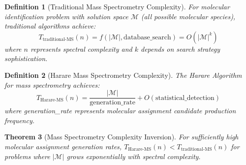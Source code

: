 \documentclass[11pt,a4paper]{article}
\newtheorem{theorem}{Theorem}[section]
\newtheorem{definition}[theorem]{Definition}
\theoremstyle{remark}
\begin{document}
\begin{definition}[Traditional Mass Spectrometry Complexity]
For molecular identification problem with solution space $\mathcal{M}$ (all possible molecular species), traditional algorithms achieve:
$$T_{\text{traditional-MS}}(n) = f(|\mathcal{M}|, \text{database\_search}) = O(|\mathcal{M}|^k)$$
where $n$ represents spectral complexity and $k$ depends on search strategy sophistication.
\end{definition}

\begin{definition}[Harare Mass Spectrometry Complexity]
The Harare Algorithm for mass spectrometry achieves:
$$T_{\text{Harare-MS}}(n) = \frac{|\mathcal{M}|}{\text{generation\_rate}} + O(\text{statistical\_detection})$$
where generation\_rate represents molecular assignment candidate production frequency.
\end{definition}

\begin{theorem}[Mass Spectrometry Complexity Inversion]
For sufficiently high molecular assignment generation rates, $T_{\text{Harare-MS}}(n) < T_{\text{traditional-MS}}(n)$ for problems where $|\mathcal{M}|$ grows exponentially with spectral complexity.
\end{theorem}
\end{document}
